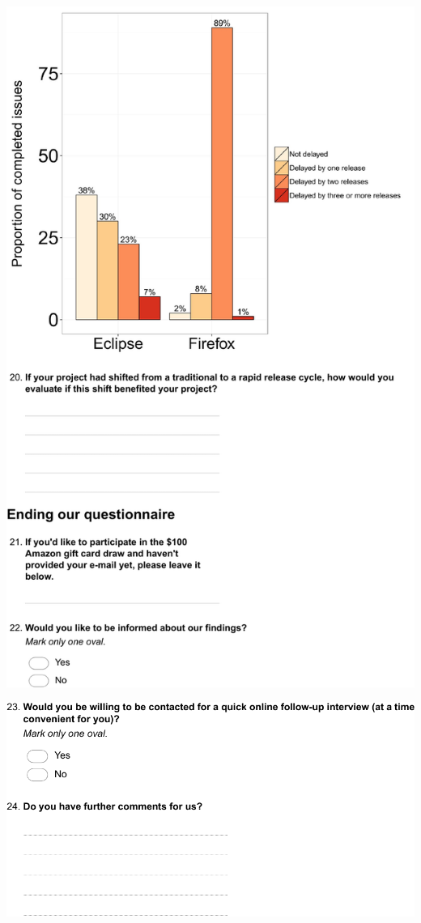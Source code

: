 \includegraphics[width=.9\textwidth]{chapters/chapter5/appendix/Eclipse7.pdf}

\includegraphics[width=.9\textwidth]{chapters/chapter5/appendix/Eclipse8.pdf}


